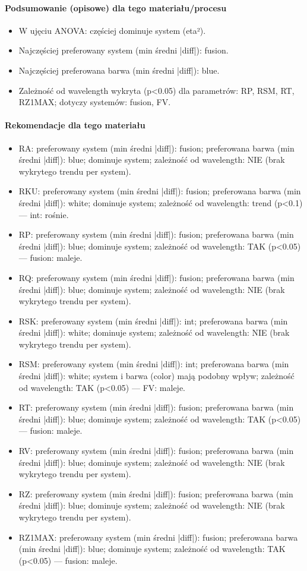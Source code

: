 \documentclass[
  10pt,
]{article}
\begin{document}
\paragraph{Podsumowanie (opisowe) dla tego materiału/procesu}
\begin{itemize}
\item W ujęciu ANOVA: częściej dominuje system (eta²).
\item Najczęściej preferowany system (min średni |diff|): fusion.
\item Najczęściej preferowana barwa (min średni |diff|): blue.
\item Zależność od wavelength wykryta (p<0.05) dla parametrów: RP, RSM, RT, RZ1MAX; dotyczy systemów: fusion, FV.
\end{itemize}
\paragraph{Rekomendacje dla tego materiału}
\begin{itemize}
\item RA: preferowany system (min średni |diff|): fusion; preferowana barwa (min średni |diff|): blue; dominuje system; zależność od wavelength: NIE (brak wykrytego trendu per system).
\item RKU: preferowany system (min średni |diff|): fusion; preferowana barwa (min średni |diff|): white; dominuje system; zależność od wavelength: trend (p<0.1) — int: rośnie.
\item RP: preferowany system (min średni |diff|): fusion; preferowana barwa (min średni |diff|): blue; dominuje system; zależność od wavelength: TAK (p<0.05) — fusion: maleje.
\item RQ: preferowany system (min średni |diff|): fusion; preferowana barwa (min średni |diff|): blue; dominuje system; zależność od wavelength: NIE (brak wykrytego trendu per system).
\item RSK: preferowany system (min średni |diff|): int; preferowana barwa (min średni |diff|): white; dominuje system; zależność od wavelength: NIE (brak wykrytego trendu per system).
\item RSM: preferowany system (min średni |diff|): int; preferowana barwa (min średni |diff|): white; system i barwa (color) mają podobny wpływ; zależność od wavelength: TAK (p<0.05) — FV: maleje.
\item RT: preferowany system (min średni |diff|): fusion; preferowana barwa (min średni |diff|): blue; dominuje system; zależność od wavelength: TAK (p<0.05) — fusion: maleje.
\item RV: preferowany system (min średni |diff|): fusion; preferowana barwa (min średni |diff|): blue; dominuje system; zależność od wavelength: NIE (brak wykrytego trendu per system).
\item RZ: preferowany system (min średni |diff|): fusion; preferowana barwa (min średni |diff|): blue; dominuje system; zależność od wavelength: NIE (brak wykrytego trendu per system).
\item RZ1MAX: preferowany system (min średni |diff|): fusion; preferowana barwa (min średni |diff|): blue; dominuje system; zależność od wavelength: TAK (p<0.05) — fusion: maleje.
\end{itemize}
\end{document}
